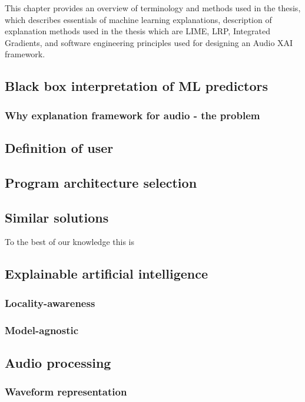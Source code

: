 \documentclass[
    bindingoffset=5mm,  %
    footnoteindent=3mm, %
    hyphenation=true    %
]{src/wut-thesis}
\begin{document}
This chapter provides an overview of terminology and methods used in the thesis,
which describes essentials of machine learning explanations, description of explanation methods
used in the thesis which are LIME, LRP, Integrated Gradients, and software engineering principles
used for designing an Audio XAI framework.

\subsection{Black box interpretation of ML predictors} %
\subsubsection{Why explanation framework for audio - the problem}

\subsection{Definition of user}
\subsection{Program architecture selection} %

\subsection{Similar solutions}

To the best of our knowledge this is 

\subsection{Explainable artificial intelligence} %
\subsubsection{Locality-awareness}
\subsubsection{Model-agnostic}

\subsection{Audio processing}
\subsubsection{Waveform representation}
\end{document}
